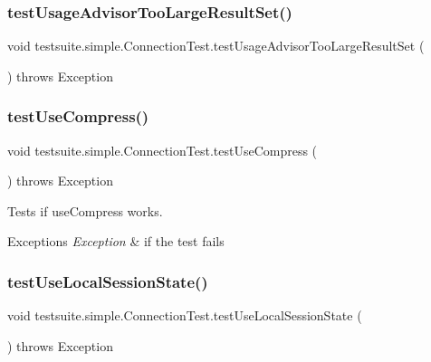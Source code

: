 \subsubsection{\texorpdfstring{test\+Usage\+Advisor\+Too\+Large\+Result\+Set()}{testUsageAdvisorTooLargeResultSet()}}
{\footnotesize\ttfamily void testsuite.\+simple.\+Connection\+Test.\+test\+Usage\+Advisor\+Too\+Large\+Result\+Set (\begin{DoxyParamCaption}{ }\end{DoxyParamCaption}) throws Exception}

\mbox{\label{classtestsuite_1_1simple_1_1_connection_test_ab5c3f7762742c5135e360e5ad11f59e5}} 
\subsubsection{\texorpdfstring{test\+Use\+Compress()}{testUseCompress()}}
{\footnotesize\ttfamily void testsuite.\+simple.\+Connection\+Test.\+test\+Use\+Compress (\begin{DoxyParamCaption}{ }\end{DoxyParamCaption}) throws Exception}

Tests if use\+Compress works.


\begin{DoxyExceptions}{Exceptions}
{\em Exception} & if the test fails \\
\hline
\end{DoxyExceptions}
\mbox{\label{classtestsuite_1_1simple_1_1_connection_test_abaf8e563e167bfb40021b103f3cccd70}} 
\subsubsection{\texorpdfstring{test\+Use\+Local\+Session\+State()}{testUseLocalSessionState()}}
{\footnotesize\ttfamily void testsuite.\+simple.\+Connection\+Test.\+test\+Use\+Local\+Session\+State (\begin{DoxyParamCaption}{ }\end{DoxyParamCaption}) throws Exception}


